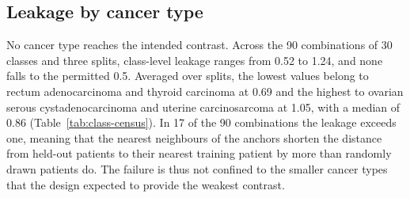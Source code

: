 \subsection{Leakage by cancer type}
\label{sec:census-classes}
No cancer type reaches the intended contrast. Across the 90 combinations of 30 classes and three splits, class-level leakage ranges from 0.52 to 1.24, and none falls to the permitted 0.5. Averaged over splits, the lowest values belong to rectum adenocarcinoma and thyroid carcinoma at 0.69 and the highest to ovarian serous cystadenocarcinoma and uterine carcinosarcoma at 1.05, with a median of 0.86 (Table~\ref{tab:class-census}). In 17 of the 90 combinations the leakage exceeds one, meaning that the nearest neighbours of the anchors shorten the distance from held-out patients to their nearest training patient by more than randomly drawn patients do. The failure is thus not confined to the smaller cancer types that the design expected to provide the weakest contrast.

